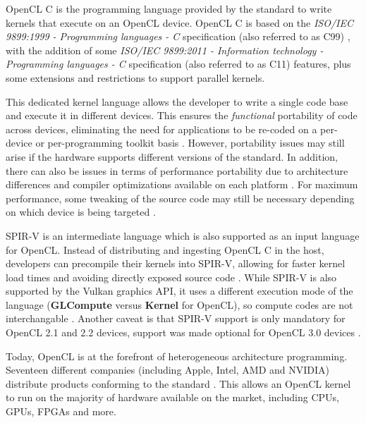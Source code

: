 OpenCL C \cite{opencl_c_spec} is the programming language provided by the standard to write kernels that execute on an OpenCL device. OpenCL C is based on the \textit{ISO/IEC 9899:1999 - Programming languages - C} specification (also referred to as C99) \cite{c99}, with the addition of some \textit{ISO/IEC 9899:2011 - Information technology - Programming languages - C} specification (also referred to as C11) \cite{c11} features, plus some extensions and restrictions to support parallel kernels.

This dedicated kernel language allows the developer to write a single code base and execute it in different devices. This ensures the \textit{functional} portability of code across devices, eliminating the need for applications to be re-coded on a per-device or per-programming toolkit basis \cite{performance_portability_2013}. However, portability issues may still arise if the hardware supports different versions of the standard. In addition, there can also be issues in terms of performance portability due to architecture differences and compiler optimizations available on each platform \cite{performance_portability_2013, performance_portability_2019, performance_portability_2020}. For maximum performance, some tweaking of the source code may still be necessary depending on which device is being targeted \cite{optimizing_opencl_fpga_integer, optimizing_opencl_fpga_automata}.

SPIR-V is an intermediate language which is also supported as an input language for OpenCL. Instead of distributing and ingesting OpenCL C in the host, developers can precompile their kernels into SPIR-V, allowing for faster kernel load times and avoiding directly exposed source code \cite{spir_overview}. While SPIR-V is also supported by the Vulkan \cite{vulkan} graphics API, it uses a different execution mode of the language (\textbf{GLCompute} versus \textbf{Kernel} for OpenCL), so compute codes are not interchangable \cite{spir_spec}. Another caveat is that SPIR-V support is only mandatory for OpenCL 2.1 and 2.2 devices, support was made optional for OpenCL 3.0 devices \cite{opencl_spec}.

Today, OpenCL is at the forefront of heterogeneous architecture programming. Seventeen different companies (including Apple, Intel, AMD and NVIDIA) distribute products conforming to the standard \cite{opencl_conformant_companies}. This allows an OpenCL kernel to run on the majority of hardware available on the market, including CPUs, GPUs, FPGAs and more.


